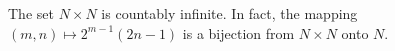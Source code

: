 The set \(N \times N\) is countably infinite. In fact, the mapping \((m, n) \mapsto 2^{m-1}(2n-1)\) is a bijection from \(N \times N\) onto \(N\).